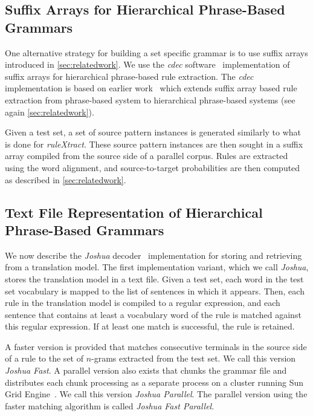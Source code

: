\subsection{Suffix Arrays for Hierarchical Phrase-Based Grammars}

One alternative strategy for building a set specific grammar is to use
suffix arrays introduced in \autoref{sec:relatedwork}. We use the \emph{cdec}
software~\citep{dyer-lopez-ganitkevitch-weese-ture-blunsom-setiawan-eidelman-resnik:2010:ACL}
implementation of suffix arrays for
hierarchical phrase-based rule extraction. The \emph{cdec} implementation is based on
earlier work~\citep{lopez:2007:EMNLP-CoNLL} which extends suffix array based
rule extraction from phrase-based system
to hierarchical phrase-based systems (see again \autoref{sec:relatedwork}).

Given a test set, a set of source pattern instances is generated similarly to
what is done for \emph{ruleXtract}. These source pattern instances are then
sought in a suffix array compiled from the source side of a parallel corpus.
Rules are extracted using the word alignment, and source-to-target
probabilities are then computed as described in \autoref{sec:relatedwork}.

\subsection{Text File Representation of Hierarchical Phrase-Based Grammars}
\label{sec:joshuaFiltering}

We now describe the \emph{Joshua}
decoder~\citep{weese-ganitkevitch-callisonburch-post-lopez:2011:WMT}
implementation for storing and retrieving from a translation
model.
The first implementation variant, which we call \emph{Joshua}, stores the
translation model in a text file. Given a test set, each word in the test set
vocabulary is mapped to the list of sentences in which it appears. Then, each
rule in the translation model is compiled to a regular expression, and each
sentence that contains at least a vocabulary word of the rule is matched against
this regular expression. If at least one match is successful, the rule is
retained.

A faster version is provided that matches consecutive terminals in the
source side of a rule to the set of $n$-grams extracted from the test set. We
call this version \emph{Joshua Fast}. A parallel version also exists that chunks
the grammar file and distributes each chunk processing as a separate process on
a cluster running Sun Grid Engine~\citep{gentzsch:2001:CCG}. We call this
version \emph{Joshua Parallel}. The parallel version using the faster matching
algorithm is called \emph{Joshua Fast Parallel}.


